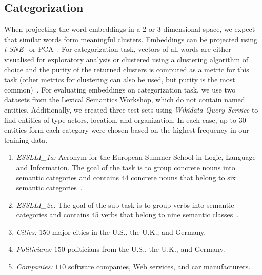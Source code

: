 \subsection{Categorization}
When projecting the word embeddings in a 2 or 3-dimensional space, we expect that similar words form meaningful clusters. Embeddings can be projected using \emph{t-SNE}~ or PCA~. For categorization task, vectors of all words are either visualised for exploratory analysis or clustered using a clustering algorithm of choice and the purity of the returned clusters is computed as a metric for this task (other metrics for clustering can also be used, but purity is the most common)~. For evaluating embeddings on categorization task, we use two datasets from the Lexical Semantics Workshop, which do not contain named entities. Additionally, we created three test sets using \emph{Wikidata Query Service} to find entities of type actors, location, and organization. In each case, up to $30$ entities form each category were chosen based on the highest frequency in our training data.
\begin{enumerate}
  \item \emph{ESSLLI\_1a:} Acronym for the European Summer School in Logic, Language
and Information. The goal of the task is to group concrete nouns into semantic categories and contains $44$ concrete nouns that belong to six semantic categories~. 
  \item \emph{ESSLLI\_2c:} The goal of the sub-task is to group verbs into semantic categories and contains $45$ verbs that belong to nine semantic classes~.
  \item \emph{Cities:} $150$ major cities in the U.S., the U.K., and Germany. 
  \item \emph{Politicians:} $150$ politicians from the U.S., the U.K., and Germany.
  \item \emph{Companies:} $110$ software companies, Web services, and car manufacturers. 
\end{enumerate}
